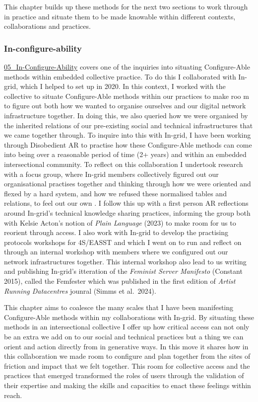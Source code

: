 This chapter builds up these methods for the next two sections to work
through in practice and situate them to be made knowable within
different contexts, collaborations and practices.

\hypertarget{in-configure-ability}{%
\subsubsection{In-configure-ability}\label{in-configure-ability}}

\href{../../05_In-Configure-Ability/05_In-Configure-Ability.md}{05\_In-Configure-Ability}
covers one of the inquiries into situating Configure-Able methods within
embedded collective practice. To do this I collaborated with In-grid,
which I helped to set up in 2020. In this context, I worked with the
collective to situate Configure-Able methods within our practices to
make roo m to figure out both how we wanted to organise ourselves and
our digital network infrastructure together. In doing this, we also
queried how we were organised by the inherited relations of our
pre-existing social and technical infrastructures that we came together
through. To inquire into this with In-grid, I have been working through
Disobedient AR to practise how these Configure-Able methods can come
into being over a reasonable period of time (2+ years) and within an
embedded intersectional community. To reflect on this collaboration I
undertook research with a focus group, where In-grid members
collectively figured out our organisational practises together and
thinking through how we were oriented and flexed by a hard system, and
how we refused these normalised tables and relations, to feel out our
own . I follow this up with a first person AR reflections around
In-grid's technical knowledge sharing practices, informing the group
both with Kelsie Acton's notion of \emph{Plain Language} (2023) to make
room for us to reorient through access. I also work with In-grid to
develop the practising protocols workshops for 4S/EASST and which I went
on to run and reflect on through an internal workshop with members where
we configured out our network infrastructures together. This internal
workshop also lead to us writing and publishing In-grid's itteration of
the \emph{Feminist Server Manifesto} (Constant 2015), called the
Femfester which was published in the first edition of \emph{Artist
Running Datacentres} jounral (Simms et al.~2024).

This chapter aims to coalesce the many scales that I have been
manifesting Configure-Able methods within my collaborations with
In-grid. By situating these methods in an intersectional collective I
offer up how critical access can not only be an extra we add on to our
social and technical practices but a thing we can orient and action
directly from in generative ways. In this move it shares how in this
collaboration we made room to configure and plan together from the sites
of friction and impact that we felt together. This room for collective
access and the practices that emerged transformed the roles of users
through the validation of their expertise and making the skills and
capacities to enact these feelings within reach.

